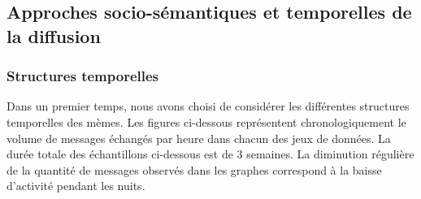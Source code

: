 \subsection[Approches socio{}-s\'emantiques et temporelles de la diffusion]{Approches socio-s\'emantiques et temporelles de la diffusion}

\subsubsection[Structures temporelles]{Structures temporelles}
Dans un premier temps, nous avons choisi de consid\'erer les diff\'erentes structures temporelles des m\`emes. Les figures ci-dessous repr\'esentent chronologiquement le volume de messages \'echang\'es par heure dans chacun des jeux de donn\'ees. La dur\'ee totale des \'echantillons ci-dessous est de 3 semaines. La diminution r\'eguli\`ere de la quantit\'e de messages observ\'es dans les graphes correspond \`a la baisse d{\textquoteright}activit\'e pendant les nuits. 

